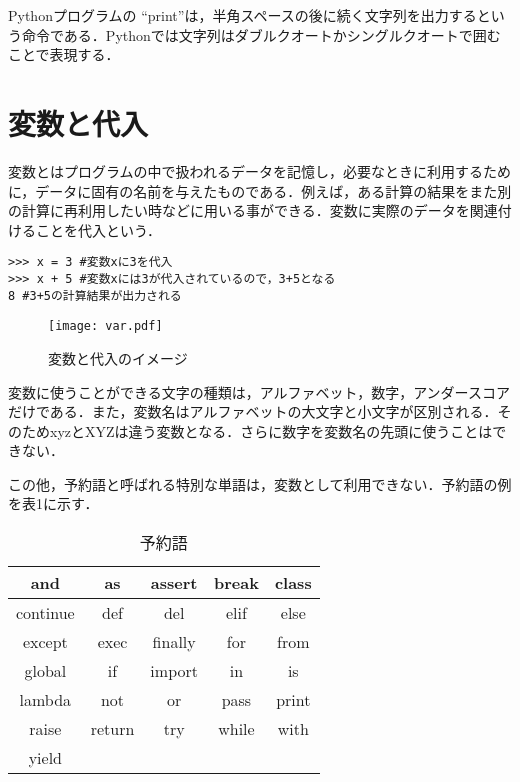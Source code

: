 Pythonプログラムの ``print''は，半角スペースの後に続く文字列を出力するという命令である．Pythonでは文字列はダブルクオートかシングルクオートで囲むことで表現する．


\section{変数と代入}
変数とはプログラムの中で扱われるデータを記憶し，必要なときに利用するために，データに固有の名前を与えたものである．例えば，ある計算の結果をまた別の計算に再利用したい時などに用いる事ができる．変数に実際のデータを関連付けることを代入という．


\begin{lstlisting}[caption=変数と代入,label=var&assign]
>>> x = 3 #変数xに3を代入
>>> x + 5 #変数xには3が代入されているので，3+5となる
8 #3+5の計算結果が出力される
\end{lstlisting}


\begin{figure}[htbp]
\begin{center}
\texttt{[image: var.pdf]}
\caption{変数と代入のイメージ}
\label{fig:fig1}
\end{center}
\end{figure}


変数に使うことができる文字の種類は，アルファベット，数字，アンダースコアだけである．また，変数名はアルファベットの大文字と小文字が区別される．そのためxyzとXYZは違う変数となる．さらに数字を変数名の先頭に使うことはできない．


この他，予約語と呼ばれる特別な単語は，変数として利用できない．予約語の例を表1に示す．


\begin{table}[h]
  \begin{center}
  \caption{予約語}
  \begin{tabular}{|c|c|c|c|c|} \hline
  and & as & assert & break & class \\ \hline
  continue & def & del & elif & else \\ \hline
  except & exec & finally & for & from \\ \hline
  global & if & import & in & is \\ \hline
  lambda & not & or & pass & print \\ \hline
  raise & return & try & while & with \\ \hline
  yield & & & & \\ \hline
  \end{tabular}
  \label{tab:tab1}
  \end{center}
\end{table}


